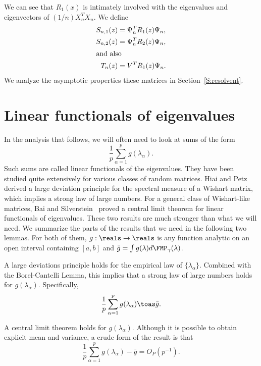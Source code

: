 We can see that $R_1(x)$ is intimately involved with the eigenvalues and
eigenvectors of $(1/n)X_n^T X_n$.  We define
\begin{align}
    S_{n,1} (z) &= \Psi_n^T R_1 (z) \Psi_n, \\
    S_{n,2} (z) &= \Psi_n^T R_2 (z) \Psi_n, \\
\intertext{and also}
    T_n (z) &= V^T R_1 (z) \Psi_n.
\end{align}
We analyze the asymptotic properties these matrices in
Section~\ref{S:resolvent}.

\section{Linear functionals of eigenvalues}

In the analysis that follows, we will often need to look at sums of the form
\[
    \frac{1}{p} \sum_{\alpha=1}^p g (\lambda_\alpha).
\]
Such sums are called linear functionals of the eigenvalues.  They have been
studied quite extensively for various classes of random matrices.  Hiai and Petz~\cite{hiai1998edw} derived a large deviation principle for the spectral measure  of a Wishart matrix, which implies a strong law of large numbers.  For a  general class of Wishart-like matrices, Bai and Silverstein~\cite{bai2004clt} proved a central limit theorem for linear functionals of eigenvalues.  These two results are much stronger than what we will need.  We summarize the parts of the results that we need in the following two lemmas. For both of them, $g: \reals \to \reals$ is any function analytic on an open interval containing $[a,b]$  and $\bar g = \int g(\lambda) d\FMP_\gamma (\lambda)$.

\begin{lemma}\label{L:wishart-lln}
    A large deviations principle holds for the empirical law of 
    $\{ \lambda_\alpha \}$.  Combined with the Borel-Cantelli Lemma, this
    implies that a strong law of large numbers holds for $g(\lambda_\alpha)$. 
    Specifically,
    \[
        \frac{1}{p} \sum_{\alpha=1}^p g( \lambda_\alpha ) \toas \bar g.
    \]
\end{lemma}
    
\begin{lemma}\label{L:wishart-clt}
    A central limit theorem holds for $g(\lambda_\alpha)$.  Although it is
    possible to obtain explicit mean and variance, a crude form of the
    result is that
    \[
        \frac{1}{p} 
        \sum_{\alpha=1}^p
            g( \lambda_\alpha ) - \bar g 
        = O_P(p^{-1}).
    \]  
\end{lemma}

